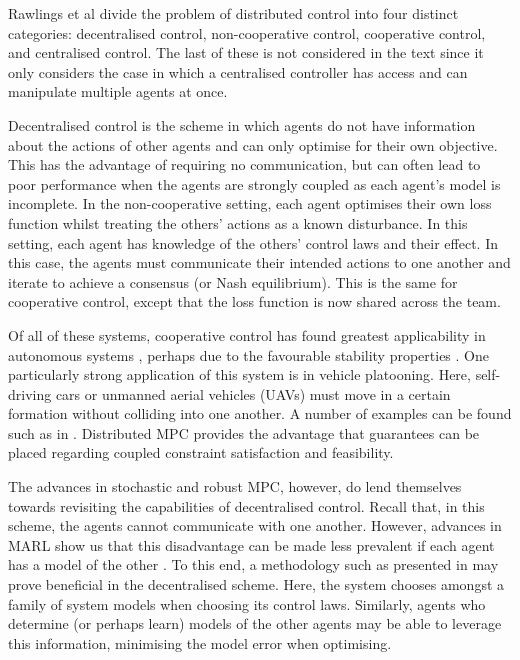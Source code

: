 \documentclass[../sample.tex]{subfiles}
\begin{document}
Rawlings et al \cite{rawlings2017model} divide the problem of distributed control into four distinct
categories: decentralised control, non-cooperative control, cooperative control, and centralised
control. The last of these is not considered in the text since it only considers the case in which a
centralised controller has access and can manipulate multiple agents at once. 

Decentralised control is the scheme in which agents do not have information about the actions of
other agents and can only optimise for their own objective. This has the advantage of requiring no
communication, but can often lead to poor performance when the agents are strongly coupled as each
agent’s model is incomplete. In the non-cooperative setting, each agent optimises their own loss
function whilst treating the others’ actions as a known disturbance. In this setting, each agent has
knowledge of the others’ control laws and their effect. In this case, the agents must communicate
their intended actions to one another and iterate to achieve a consensus (or Nash equilibrium). This
is the same for cooperative control, except that the loss function is now shared across the team. 

Of all of these systems, cooperative control has found greatest applicability in autonomous systems
\cite{Negenborn2014}, perhaps due to the favourable stability properties \cite{Venkat2006}. One
particularly strong application of this system is in vehicle platooning. Here, self-driving cars or
unmanned aerial vehicles (UAVs) must move in a certain formation without colliding into one another.
A number of examples can be found such as in \cite{Liu2019, VanParys2017, Zheng2017}. Distributed
MPC provides the advantage that guarantees can be placed regarding coupled constraint satisfaction and
feasibility.

The advances in stochastic and robust MPC, however, do lend themselves towards revisiting the
capabilities of decentralised control. Recall that, in this scheme, the agents cannot communicate
with one another. However, advances in MARL show us that this disadvantage can be made less
prevalent if each agent has a model of the other \cite{Foerster}. To this end, a methodology such as
presented in \cite{Heirung2019} may prove beneficial in the decentralised scheme. Here, the system
chooses amongst a family of system models when choosing its control laws. Similarly, agents who
determine (or perhaps learn) models of the other agents may be able to leverage this information,
minimising the model error when optimising.
\end{document}

